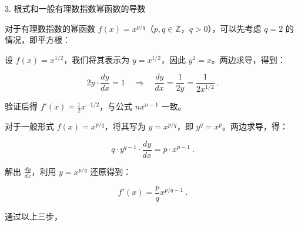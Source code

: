 3. 根式和一般有理数指数幂函数的导数

对于有理数指数的幂函数 $f(x) = x^{p/q}$（$p, q \in \mathbb{Z}$，$q > 0$），可以先考虑 $q=2$ 的情况，即平方根：

设 $f(x) = x^{1/2}$，我们将其表示为 $y = x^{1/2}$，因此 $y^2 = x$。两边求导，得到：

$$
2y \cdot \frac{dy}{dx} = 1 \quad \Rightarrow \quad \frac{dy}{dx} = \frac{1}{2y} = \frac{1}{2x^{1/2}}~.
$$

验证后得 $f'(x) = \frac{1}{2}x^{-1/2}$，与公式 $nx^{n-1}$ 一致。

对于一般形式 $f(x) = x^{p/q}$，将其写为 $y = x^{p/q}$，即 $y^q = x^p$。两边求导，得：

$$
q \cdot y^{q-1} \cdot \frac{dy}{dx} = p \cdot x^{p-1}~.
$$

解出 $\frac{dy}{dx}$，利用 $y = x^{p/q}$ 还原得到：

$$
f'(x) = \frac{p}{q}x^{p/q - 1}~.
$$

通过以上三步，
